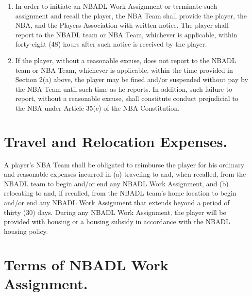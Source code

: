\documentclass[
]{book}
\providecommand{\tightlist}{%
  \setlength{\itemsep}{0pt}\setlength{\parskip}{0pt}}
\begin{document}
\begin{enumerate}
\def\labelenumi{(\alph{enumi})}
\tightlist
\item
  In order to initiate an NBADL Work Assignment or terminate such assignment and recall the player, the NBA Team shall provide the player, the NBA, and the Players Association with written notice. The player shall report to the NBADL team or NBA Team, whichever is applicable, within forty-eight (48) hours after such notice is received by the player.
\item
  If the player, without a reasonable excuse, does not report to the NBADL team or NBA Team, whichever is applicable, within the time provided in Section 2(a) above, the player may be fined and/or suspended without pay by the NBA Team until such time as he reports. In addition, such failure to report, without a reasonable excuse, shall constitute conduct prejudicial to the NBA under Article 35(e) of the NBA Constitution.
\end{enumerate}

\hypertarget{travel-and-relocation-expenses.}{%
\section{Travel and Relocation Expenses.}\label{travel-and-relocation-expenses.}}

A player's NBA Team shall be obligated to reimburse the player for his ordinary and reasonable expenses incurred in (a) traveling to and, when recalled, from the NBADL team to begin and/or end any NBADL Work Assignment, and (b) relocating to and, if recalled, from the NBADL team's home location to begin and/or end any NBADL Work Assignment that extends beyond a period of thirty (30) days. During any NBADL Work Assignment, the player will be provided with housing or a housing subsidy in accordance with the NBADL housing policy.

\hypertarget{terms-of-nbadl-work-assignment.}{%
\section{Terms of NBADL Work Assignment.}\label{terms-of-nbadl-work-assignment.}}
\end{document}
